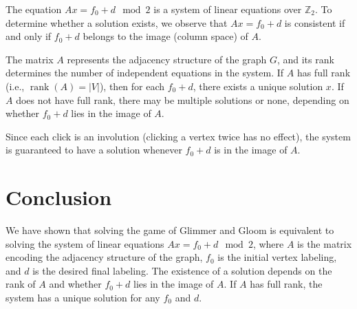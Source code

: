 \documentclass{article}
\begin{document}
The equation \( A x = f_0 + d \mod 2 \) is a system of linear equations over \( \mathbb{Z}_2 \). To determine whether a solution exists, we observe that \( A x = f_0 + d \) is consistent if and only if \( f_0 + d \) belongs to the image (column space) of \( A \). 

The matrix \( A \) represents the adjacency structure of the graph \( G \), and its rank determines the number of independent equations in the system. If \( A \) has full rank (i.e., \( \operatorname{rank}(A) = |V| \)), then for each \( f_0 + d \), there exists a unique solution \( x \). If \( A \) does not have full rank, there may be multiple solutions or none, depending on whether \( f_0 + d \) lies in the image of \( A \).

Since each click is an involution (clicking a vertex twice has no effect), the system is guaranteed to have a solution whenever \( f_0 + d \) is in the image of \( A \).

\section{Conclusion}

We have shown that solving the game of Glimmer and Gloom is equivalent to solving the system of linear equations \( A x = f_0 + d \mod 2 \), where \( A \) is the matrix encoding the adjacency structure of the graph, \( f_0 \) is the initial vertex labeling, and \( d \) is the desired final labeling. The existence of a solution depends on the rank of \( A \) and whether \( f_0 + d \) lies in the image of \( A \). If \( A \) has full rank, the system has a unique solution for any \( f_0 \) and \( d \).
\end{document}
